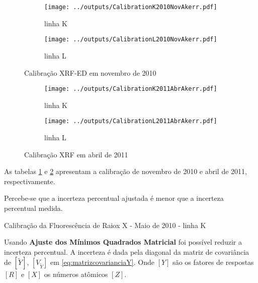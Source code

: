\begin{figure}[H]
  \begin{subfigure}[b]{0.5\textwidth}
   \texttt{[image: ../outputs/CalibrationK2010NovAkerr.pdf]}
    \caption{linha K}
  \end{subfigure}
  \begin{subfigure}[b]{0.5\textwidth}
    \texttt{[image: ../outputs/CalibrationL2010NovAkerr.pdf]}
    \caption{linha L}
  \end{subfigure}
  \caption{Calibração XRF-ED em novembro de 2010 \label{fig:edx_calib_KLnov2010}}
\end{figure}

\newpage
\begin{figure}[H]
  \begin{subfigure}[b]{0.5\textwidth}
    \texttt{[image: ../outputs/CalibrationK2011AbrAkerr.pdf]}
    \caption{linha K}
  \end{subfigure}
  \begin{subfigure}[b]{0.5\textwidth}
    \texttt{[image: ../outputs/CalibrationL2011AbrAkerr.pdf]}
    \caption{linha L}
  \end{subfigure}
\caption{Calibração XRF em  abril de 2011 \label{fig:edx_calib_KLabr2011}}
\end{figure}

As tabelas \ref{fig:edx_calib_KLnov2010} e \ref{fig:edx_calib_KLabr2011}
apresentam a calibração de novembro de 2010 e abril de 2011, respectivamente.
 
Percebe-se que a incerteza percentual ajustada é menor que 
a incerteza percentual medida. 

\begin{landscape}
\begin{table}[H]
  \centering
    
  \caption{Calibração da Fluorescência de Raiox X - Maio de 2010 - linha K
  \label{table:edx_calib_Kmaio2010}}
\end{table}
\end{landscape}

Usando \textbf{Ajuste dos Mínimos Quadrados Matricial} foi possível
reduzir a incerteza percentual. 
A incerteza é dada pela diagonal da matriz de covariância 
de $[\tilde{Y}]$, $[V_{\tilde{Y}}]$ em \ref{eq:matrizcovarianciaY}.
Onde $[Y]$ são os fatores de respostas $[R]$ e $[X]$ os números atômicos $[Z]$.

\begin{table}[H]
  \begin{footnotesize} %
  
  \end{footnotesize}
\end{table}

